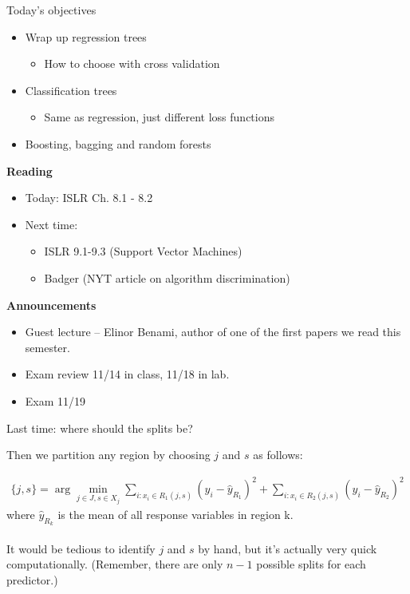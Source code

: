 \documentclass[mathserif, aspectratio=169]{beamer}
\begin{document}
\begin{frame}{Today's objectives}


\begin{itemize}
\item Wrap up regression trees
\begin{itemize}
\item How to choose with cross validation
\end{itemize}
\item Classification trees
\begin{itemize}
\item Same as regression, just different loss functions
\end{itemize}
\item Boosting, bagging and random forests
\end{itemize}

\textbf{Reading}
\begin{itemize}
\item Today: ISLR Ch. 8.1 - 8.2
\item Next time: 
\begin{itemize}
	\item ISLR 9.1-9.3 (Support Vector Machines)
	\item Badger (NYT article on algorithm discrimination)
\end{itemize}
\end{itemize}

\textbf{Announcements}
\begin{itemize}
\item Guest lecture -- Elinor Benami, author of one of the first papers we read this semester.
\item Exam review 11/14 in class, 11/18 in lab.
\item Exam 11/19
\end{itemize}

\end{frame}



\begin{frame}{Last time: where should the splits be?}

Then we partition any region by choosing $j$ and $s$ as follows:

\begin{align*}
\{j,s\} = \arg \min_{j\in J, s\in X_j} \sum_{i:x_i\in R_1(j,s)} (y_i-\hat{y}_{R_1})^2 + \sum_{i:x_i\in R_2(j,s)} (y_i-\hat{y}_{R_2})^2
\end{align*}
where $\hat{y}_{R_k}$ is the mean of all response variables in region k.  \\~\\

It would be tedious to identify $j$ and $s$ by hand, but it's actually very quick computationally.  (Remember, there are only $n-1$ possible splits for each predictor.)
\end{frame}
\end{document}

